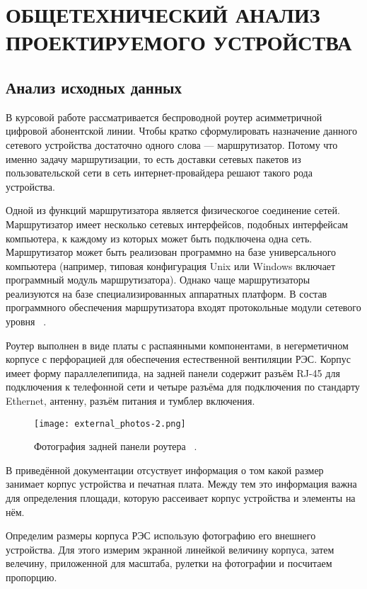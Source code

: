 \section{ОБЩЕТЕХНИЧЕСКИЙ АНАЛИЗ ПРОЕКТИРУЕМОГО УСТРОЙСТВА}
\subsection{Анализ исходных данных}

В курсовой работе рассматривается беспроводной роутер асимметричной
цифровой абонентской линии.  Чтобы кратко сформулировать назначение
данного сетевого устройства достаточно одного слова — маршрутизатор.
Потому что именно задачу маршрутизации, то есть доставки сетевых
пакетов из пользовательской сети в сеть интернет-провайдера решают
такого рода устройства.


Одной из функций маршрутизатора является физическогое соединение
сетей. Маршрутизатор имеет несколько сетевых интерфейсов, подобных
интерфейсам компьютера, к каждому из которых может быть подключена
одна сеть. Маршрутизатор может быть реализован программно на базе
универсального компьютера (например, типовая конфигурация Unix или
Windows включает программный модуль маршрутизатора). Однако чаще
маршрутизаторы реализуются на базе специализированных аппаратных
платформ. В состав программного обеспечения маршрутизатора входят
протокольные модули сетевого уровня ~\cite{NetworksOlifer2016}.

Роутер выполнен в виде платы с распаянными компонентами, в
негерметичном корпусе с перфорацией для обеспечения естественной
вентиляции РЭС. Корпус имеет форму параллелепипида, на задней панели
содержит разъём RJ-45 для подключения к телефонной сети и четыре
разъёма для подключения по стандарту Ethernet, антенну, разъём питания
и тумблер включения.

\begin{figure}[h] %
  \centering
\texttt{[image: external\_photos-2.png]}
\caption{Фотография задней панели роутера ~\cite{EXTERNAL_PHOTOS}.}

\end{figure}

В приведённой документации отсуствует информация о том какой размер
занимает корпус устройства и печатная плата.
Между тем это информация важна для определения площади,
которую рассеивает корпус устройства и элементы на нём.

Определим размеры корпуса РЭС использую фотографию его внешнего
устройства. Для этого измерим экранной линейкой величину корпуса,
затем велечину, приложенной для масштаба, рулетки на фотографии и
посчитаем пропорцию.


